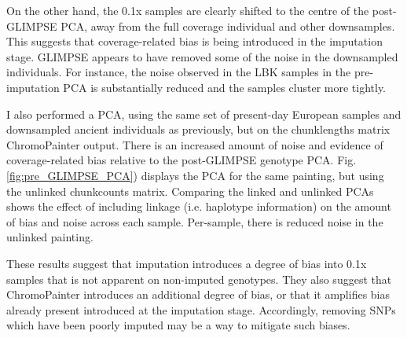 On the other hand, the 0.1x samples are clearly shifted to the centre of the post-GLIMPSE PCA, away from the full coverage individual and other downsamples. This suggests that coverage-related bias is being introduced in the imputation stage. GLIMPSE appears to have removed some of the noise in the downsampled individuals. For instance, the noise observed in the LBK samples in the pre-imputation PCA is substantially reduced and the samples cluster more tightly.  

I also performed a PCA, using the same set of present-day European samples and downsampled ancient individuals as previously, but on the chunklengths matrix ChromoPainter output. There is an increased amount of noise and evidence of coverage-related bias relative to the post-GLIMPSE genotype PCA. Fig. \ref{fig:pre_GLIMPSE_PCA}) displays the PCA for the same painting, but using the unlinked chunkcounts matrix. Comparing the linked and unlinked PCAs shows the effect of including linkage (i.e. haplotype information) on the amount of bias and noise across each sample. Per-sample, there is reduced noise in the unlinked painting.

These results suggest that imputation introduces a degree of bias into 0.1x samples that is not apparent on non-imputed genotypes. They also suggest that ChromoPainter introduces an additional degree of bias, or that it amplifies bias already present introduced at the imputation stage. Accordingly, removing SNPs which have been poorly imputed may be a way to mitigate such biases.

